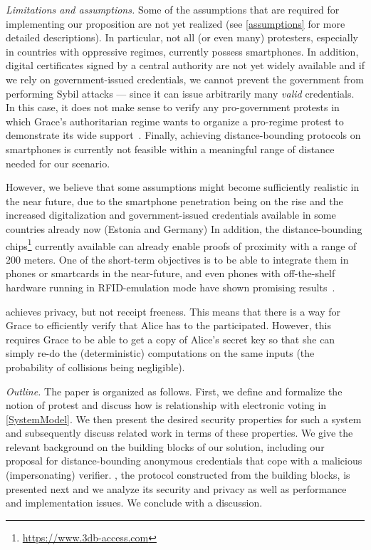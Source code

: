 \emph{Limitations and assumptions.} Some of the assumptions that are required for implementing our proposition are not yet realized (see \cref{assumptions} for more detailed descriptions). 
In particular, not all (or even many) protesters, especially in countries with oppressive regimes, currently possess smartphones.
In addition, digital certificates signed by a central authority are not yet widely available and if we rely on government-issued credentials, we cannot prevent the government from performing Sybil attacks --- since it can issue arbitrarily many \emph{valid} credentials. 
In this case, it does not make sense to verify any pro-government protests in which Grace's authoritarian regime wants to organize a pro-regime protest to demonstrate its wide support~\cite[e.g.][]{AlJazeeraOnVenezuela2017,VenezuelanStateWorkersCalledToParticipate}.
Finally, achieving distance-bounding protocols on smartphones is currently not feasible within a meaningful range of distance needed for our scenario. 

However, we believe that some assumptions might become sufficiently realistic in the near future, due to the smartphone penetration being on the rise and the increased digitalization and government-issued credentials available in some countries already now (\eg Estonia and Germany)
In addition, the distance-bounding chips\footnote{\url{https://www.3db-access.com}} currently available can already enable proofs of proximity with a range of 200 meters.
One of the short-term objectives is to be able to integrate them in phones or smartcards in the near-future, and even phones with off-the-shelf hardware running in RFID-emulation mode have shown promising results~\cite{DBonSmartphones}.

\PRIVO achieves privacy, but not receipt freeness.
This means that there is a way for Grace to efficiently verify that Alice has to the participated.
However, this requires Grace to be able to get a copy of Alice's secret key so that she can simply re-do the (deterministic) computations on the same inputs (the probability of collisions being negligible).

\emph{Outline.} The paper is organized as follows. 
First, we define and formalize the notion of protest and discuss how is relationship with electronic voting in \cref{SystemModel}.  
We then present the desired security properties for such a system and subsequently discuss related work in terms of these properties. 
We give the relevant background on the building blocks of our solution, including our proposal for distance-bounding anonymous credentials that cope with a malicious (impersonating) verifier. \PRIVO, the protocol constructed from the building blocks, is presented next and we analyze its security and privacy as well as performance and implementation issues. We conclude with a discussion. 
